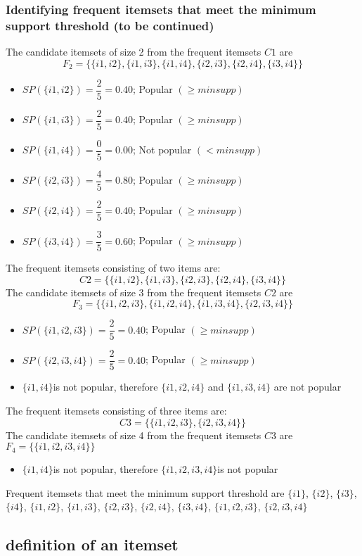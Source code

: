 \subsubsection{Identifying frequent itemsets that meet the minimum support threshold (to be continued)}
The candidate itemsets of size 2 from the frequent itemsets \(C1\) are \[F_2=\{\{i1,i2\},\{i1,i3\},\{i1,i4\},\{i2,i3\},\{i2,i4\},\{i3,i4\}\}\]
\begin{itemize}
\item \(SP(\{i1,i2\})=\dfrac{2}{5}=0.40\); Popular \((\geq minsupp)\)
\item \(SP(\{i1,i3\})=\dfrac{2}{5}=0.40\); Popular  \((\geq minsupp)\)
\item \(SP(\{i1,i4\})=\dfrac{0}{5}=0.00\); Not popular  \((< minsupp)\)
\item \(SP(\{i2,i3\})=\dfrac{4}{5}=0.80\); Popular  \((\geq minsupp)\)
\item \(SP(\{i2,i4\})=\dfrac{2}{5}=0.40\); Popular  \((\geq minsupp)\)
\item \(SP(\{i3,i4\})=\dfrac{3}{5}=0.60\); Popular  \((\geq minsupp)\)
\end{itemize}
The frequent itemsets consisting of two items are: \[C2=\{\{i1,i2\},\{i1,i3\},\{i2,i3\},\{i2,i4\},\{i3,i4\}\}\]
The candidate itemsets of size 3 from the frequent itemsets \(C2\) are \[F_3=\{\{i1,i2,i3\},\{i1,i2,i4\},\{i1,i3,i4\},\{i2,i3,i4\}\}\]
\begin{itemize}
\item \(SP(\{i1,i2,i3\})=\dfrac{2}{5}=0.40\); Popular \((\geq minsupp)\)
\item \(SP(\{i2,i3,i4\})=\dfrac{2}{5}=0.40\); Popular  \((\geq minsupp)\)
\item \(\{i1,i4\}\)is not popular, therefore \(\{i1, i2, i4\}\) and \(\{i1, i3, i4\}\) are not popular
\end{itemize}
The frequent itemsets consisting of three items are: \[C3=\{\{i1,i2,i3\},\{i2,i3,i4\}\}\]
The candidate itemsets of size 4 from the frequent itemsets \(C3\) are \(F_4=\{\{i1,i2,i3,i4\}\}\)
\begin{itemize}
\item \(\{i1,i4\}\)is not popular, therefore \(\{i1, i2, i3, i4\}\)is not popular
\end{itemize}
Frequent itemsets that meet the minimum support threshold are \(\{i1\}\), \(\{i2\}\), \(\{i3\}\), \(\{i4\}\), \(\{i1,i2\}\), \(\{i1,i3\}\), \(\{i2,i3\}\), \(\{i2,i4\}\), \(\{i3,i4\}\), \(\{i1,i2,i3\}\), \(\{i2,i3,i4\}\)
\newpage
\subsection{definition of an itemset}

